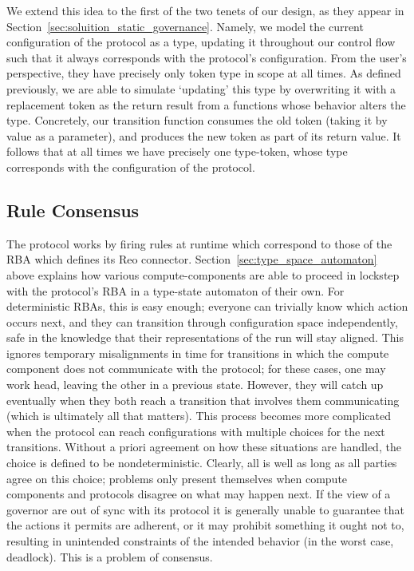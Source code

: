 We extend this idea to the first of the two tenets of our design, as they appear in Section~\ref{sec:soluition_static_governance}. Namely, we model the current configuration of the protocol as a type, updating it throughout our control flow such that it always corresponds with the protocol's configuration. From the user's perspective, they have precisely only token type in scope at all times. As defined previously, we are able to simulate `updating' this type by overwriting it with a replacement token as the return result from a functions whose behavior alters the type. Concretely, our transition function consumes the old token (taking it by value as a parameter), and produces the new token as part of its return value. It follows that at all times we have precisely one type-token, whose type corresponds with the configuration of the protocol.

\subsection{Rule Consensus}
\label{sec:rule_consensus}
The protocol works by firing rules at runtime which correspond to those of the RBA which defines its Reo connector. Section~\ref{sec:type_space_automaton} above explains how various compute-components are able to proceed in lockstep with the protocol's RBA in a type-state automaton of their own. For deterministic RBAs, this is easy enough; everyone can trivially know which action occurs next, and they can transition through configuration space independently, safe in the knowledge that their representations of the run will stay aligned. This ignores temporary misalignments in time for transitions in which the compute component does not communicate with the protocol; for these cases, one may work head, leaving the other in a previous state. However, they will catch up eventually when they both reach a transition that involves them communicating (which is ultimately all that matters). This process becomes more complicated when the protocol can reach configurations with multiple choices for the next transitions. Without a priori agreement on how these situations are handled, the choice is defined to be nondeterministic. Clearly, all is well as long as all parties agree on this choice; problems only present themselves when compute components and protocols disagree on what may happen next. If the view of a governor are out of sync with its protocol it is generally unable to guarantee that the actions it permits are adherent, or it may prohibit something it ought not to, resulting in unintended constraints of the intended behavior (in the worst case, deadlock). This is a problem of consensus. 

